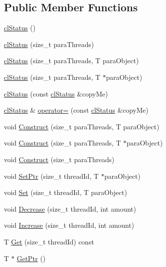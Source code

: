 \subsection*{Public Member Functions}
\begin{DoxyCompactItemize}
\item 
\hyperlink{classcl_status_afcb4f21b2d2c87c0aace3aa7c17e3d89}{clStatus} ()
\item 
\hyperlink{classcl_status_ac9d45c567036928afef3a2c3a6ee4c8f}{clStatus} (size\_\-t paraThreads)
\item 
\hyperlink{classcl_status_a26a56deeb87c20c37b8c430bd479cf90}{clStatus} (size\_\-t paraThreads, T paraObject)
\item 
\hyperlink{classcl_status_a0fb3a309114ccd500d2fbacfa0e38611}{clStatus} (size\_\-t paraThreads, T $\ast$paraObject)
\item 
\hyperlink{classcl_status_a63ce60e9c51e81341fba83579cbe4f43}{clStatus} (const \hyperlink{classcl_status}{clStatus} \&copyMe)
\item 
\hyperlink{classcl_status}{clStatus} \& \hyperlink{classcl_status_aa423efa5e3d8f00fe19899c9f78d3569}{operator=} (const \hyperlink{classcl_status}{clStatus} \&copyMe)
\item 
void \hyperlink{classcl_status_aa0a30d0e9b2f5afeba58589ee34f22b9}{Construct} (size\_\-t paraThreads, T paraObject)
\item 
void \hyperlink{classcl_status_a82a13eb465683325977cf2a7e33cedd4}{Construct} (size\_\-t paraThreads, T $\ast$paraObject)
\item 
void \hyperlink{classcl_status_ad58efb879ae3de808186d7dd9fd483c8}{Construct} (size\_\-t paraThreads)
\item 
void \hyperlink{classcl_status_aac5f254382c3699eade1051af4bc2e1f}{SetPtr} (size\_\-t threadId, T $\ast$paraObject)
\item 
void \hyperlink{classcl_status_a59901ad303000699269f05efc1536295}{Set} (size\_\-t threadId, T paraObject)
\item 
void \hyperlink{classcl_status_adedcdb2ba1fdaea96b899b2690a6db86}{Decrease} (size\_\-t threadId, int amount)
\item 
void \hyperlink{classcl_status_a5ecfb11e33a1a1be6fdeb2543c95575b}{Increase} (size\_\-t threadId, int amount)
\item 
T \hyperlink{classcl_status_aa036ebed047d80f83aecf9e2fb9dbbef}{Get} (size\_\-t threadId) const 
\item 
T $\ast$ \hyperlink{classcl_status_a13318f83afd66349e81adf9400c6ff78}{GetPtr} ()

\end{DoxyCompactItemize}
